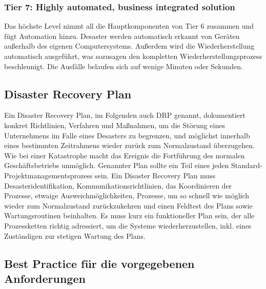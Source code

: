 \documentclass[letterpaper, 12pt]{article}
\let\tempsubsection\subsection
\renewcommand\subsection[1]{\vspace{0cm}\tempsubsection{#1}\vspace{0cm}}
\let\tempsubsubsection\subsubsection
\renewcommand\subsubsection[1]{\vspace{0cm}\tempsubsubsection{#1}\vspace{0cm}}
\begin{document}
\subsubsection{Tier 7: Highly automated, business integrated solution}

Das höchste Level nimmt all die Hauptkomponenten von Tier 6 zusammen und fügt Automation hinzu. Desaster werden automatisch erkannt von Geräten außerhalb des eigenen Computersystems.
Außerdem wird die Wiederherstellung automatisch ausgeführt, was sozusagen den kompletten
Wiederherstellungsprozess beschleunigt. Die Ausfälle
belaufen sich auf wenige Minuten oder Sekunden. \cite{ausarbeitungdis}

\subsection{Disaster Recovery Plan}

Ein Disaster Recovery Plan, im Folgenden auch DRP genannt, dokumentiert
konkret Richtlinien, Verfahren und Maßnahmen, um die Störung eines Unternehmens im Falle eines
Desasters zu begrenzen, und möglichst innerhalb eines bestimmten Zeitrahmens wieder zurück
zum Normalzustand überzugehen. Wie bei einer Katastrophe macht das Ereignis die Fortführung
des normalen Geschäftsbetriebs unmöglich. Genannter Plan sollte ein Teil eines jeden Standard-
Projektmanagementsprozess sein. Ein Disaster Recovery Plan muss Desasteridentifikation, Kommunikationsrichtlinien, das Koordinieren
der Prozesse, etwaige Ausweichmöglichkeiten, Prozesse, um so schnell wie möglich wieder
zum Normalzustand zurückzukehren und einen Feldtest des Plans sowie Wartungsroutinen beinhalten.
Es muss kurz ein funktioneller Plan sein, der alle Prozessketten richtig adressiert, um die
Systeme wiederherzustellen, inkl. eines Zuständigen zur stetigen Wartung des Plans. \cite{ausarbeitungdis}

\subsection{Best Practice für die vorgegebenen Anforderungen}
\end{document}
